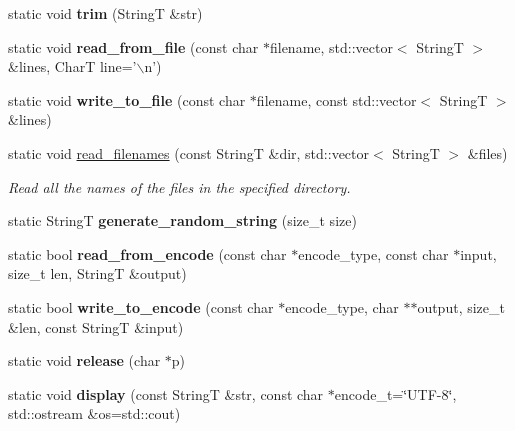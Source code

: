 \begin{CompactItemize}
\item 
\hypertarget{classAlgorithm_bde58525e896a9335411f68393f87d10}{
static void \textbf{trim} (StringT \&str)}
\label{classAlgorithm_bde58525e896a9335411f68393f87d10}

\item 
\hypertarget{classAlgorithm_c4fed76db6affd3bfa4217b1bf57744e}{
static void \textbf{read\_\-from\_\-file} (const char $\ast$filename, std::vector$<$ StringT $>$ \&lines, CharT line='$\backslash$n')}
\label{classAlgorithm_c4fed76db6affd3bfa4217b1bf57744e}

\item 
\hypertarget{classAlgorithm_a2b2c0788b3dbb1521eae8685478aa2e}{
static void \textbf{write\_\-to\_\-file} (const char $\ast$filename, const std::vector$<$ StringT $>$ \&lines)}
\label{classAlgorithm_a2b2c0788b3dbb1521eae8685478aa2e}

\item 
static void \hyperlink{classAlgorithm_7f3d9af1b1567546161c773696660c5f}{read\_\-filenames} (const StringT \&dir, std::vector$<$ StringT $>$ \&files)
\begin{CompactList}\small\item\em Read all the names of the files in the specified directory. \item\end{CompactList}\item 
\hypertarget{classAlgorithm_fa3287000daf77817025b444b951af77}{
static StringT \textbf{generate\_\-random\_\-string} (size\_\-t size)}
\label{classAlgorithm_fa3287000daf77817025b444b951af77}

\item 
\hypertarget{classAlgorithm_f51c5e010fd029995daabff0ba2dd224}{
static bool \textbf{read\_\-from\_\-encode} (const char $\ast$encode\_\-type, const char $\ast$input, size\_\-t len, StringT \&output)}
\label{classAlgorithm_f51c5e010fd029995daabff0ba2dd224}

\item 
\hypertarget{classAlgorithm_71b0e9191bc505859f1b6d4d50cb9a16}{
static bool \textbf{write\_\-to\_\-encode} (const char $\ast$encode\_\-type, char $\ast$$\ast$output, size\_\-t \&len, const StringT \&input)}
\label{classAlgorithm_71b0e9191bc505859f1b6d4d50cb9a16}

\item 
\hypertarget{classAlgorithm_2089d52191fd52e7cf0d6574ad72212b}{
static void \textbf{release} (char $\ast$p)}
\label{classAlgorithm_2089d52191fd52e7cf0d6574ad72212b}

\item 
\hypertarget{classAlgorithm_1bda1a6c7890a94c5b5e3a687965bfe4}{
static void \textbf{display} (const StringT \&str, const char $\ast$encode\_\-t=\char`\"{}UTF-8\char`\"{}, std::ostream \&os=std::cout)}
\label{classAlgorithm_1bda1a6c7890a94c5b5e3a687965bfe4}

\end{CompactItemize}


